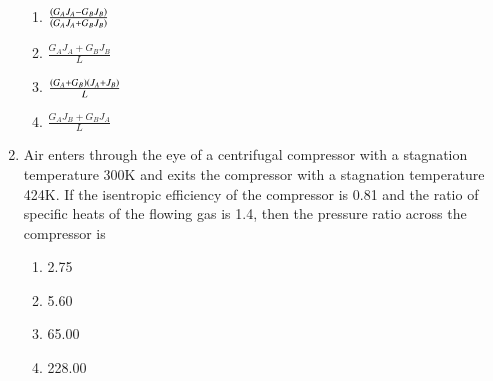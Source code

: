 \documentclass[journal]{IEEEtran}
\numberwithin{equation}{enumi}
\numberwithin{figure}{enumi}
\begin{document}
\begin{enumerate}[start=35]

\begin{enumerate}
        \item $\frac{\left(G_A J_A - G_B J_B\right)}{\left(G_A J_A + G_B J_B\right)}$
	      \item $\frac{G_A J_A + G_B J_B}{L}$
	    \item $\frac{\left(G_A+G_B\right)\left(J_A+J_B\right)}{L}$
	    \item $\frac{G_A J_B + G_B J_A}{L}$
    \end{enumerate}
  
   \item Air enters through the eye of a centrifugal compressor with a stagnation temperature 300K and exits the compressor with a stagnation temperature 424K. If the isentropic efficiency of the compressor is 0.81 and the ratio of specific heats of the flowing gas  is 1.4, then the pressure ratio across the compressor is
    \begin{enumerate}
    	\item 2.75
    	\item 5.60
    	\item 65.00
	\item 228.00
    \end{enumerate}


\end{enumerate}
\end{document}
